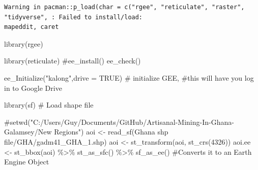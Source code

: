 \documentclass[
  letterpaper,
  DIV=11,
  numbers=noendperiod]{scrartcl}
\newenvironment{Shaded}{\begin{snugshade}}{\end{snugshade}}
\newcommand{\AttributeTok}[1]{\textcolor[rgb]{0.40,0.45,0.13}{#1}}
\newcommand{\CommentTok}[1]{\textcolor[rgb]{0.37,0.37,0.37}{#1}}
\newcommand{\ConstantTok}[1]{\textcolor[rgb]{0.56,0.35,0.01}{#1}}
\newcommand{\DecValTok}[1]{\textcolor[rgb]{0.68,0.00,0.00}{#1}}
\newcommand{\FunctionTok}[1]{\textcolor[rgb]{0.28,0.35,0.67}{#1}}
\newcommand{\NormalTok}[1]{\textcolor[rgb]{0.00,0.23,0.31}{#1}}
\newcommand{\OtherTok}[1]{\textcolor[rgb]{0.00,0.23,0.31}{#1}}
\newcommand{\SpecialCharTok}[1]{\textcolor[rgb]{0.37,0.37,0.37}{#1}}
\newcommand{\StringTok}[1]{\textcolor[rgb]{0.13,0.47,0.30}{#1}}
\begin{document}
\begin{verbatim}
Warning in pacman::p_load(char = c("rgee", "reticulate", "raster", "tidyverse", : Failed to install/load:
mapeddit, caret
\end{verbatim}

\begin{Shaded}
\begin{Highlighting}[]
\FunctionTok{library}\NormalTok{(rgee)}

\FunctionTok{library}\NormalTok{(reticulate)}
\CommentTok{\#ee\_install() }
\FunctionTok{ee\_check}\NormalTok{()}

\FunctionTok{ee\_Initialize}\NormalTok{(}\StringTok{"kalong"}\NormalTok{,}\AttributeTok{drive =} \ConstantTok{TRUE}\NormalTok{) }\CommentTok{\# initialize GEE, }
\CommentTok{\#this will have you log in to Google Drive}
\end{Highlighting}
\end{Shaded}

\begin{Shaded}
\begin{Highlighting}[]
\FunctionTok{library}\NormalTok{(}\StringTok{\textquotesingle{}sf\textquotesingle{}}\NormalTok{)}
\CommentTok{\# Load shape file}

\CommentTok{\#setwd("C:/Users/Guy/Documents/GitHub/Artisanal{-}Mining{-}In{-}Ghana{-}Galamsey/New Regions")}
\NormalTok{aoi }\OtherTok{\textless{}{-}} \FunctionTok{read\_sf}\NormalTok{(}\StringTok{\textquotesingle{}Ghana shp file/GHA/gadm41\_GHA\_1.shp\textquotesingle{}}\NormalTok{)}
\NormalTok{aoi }\OtherTok{\textless{}{-}} \FunctionTok{st\_transform}\NormalTok{(aoi, }\FunctionTok{st\_crs}\NormalTok{(}\DecValTok{4326}\NormalTok{))}
\NormalTok{aoi.ee }\OtherTok{\textless{}{-}} \FunctionTok{st\_bbox}\NormalTok{(aoi) }\SpecialCharTok{\%\textgreater{}\%} 
\FunctionTok{st\_as\_sfc}\NormalTok{() }\SpecialCharTok{\%\textgreater{}\%} 
\FunctionTok{sf\_as\_ee}\NormalTok{() }\CommentTok{\#Converts it to an Earth Engine Object}
\end{Highlighting}
\end{Shaded}
\end{document}
